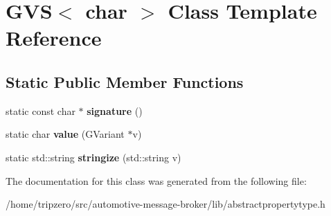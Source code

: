 \hypertarget{classGVS_3_01char_01_4}{\section{G\-V\-S$<$ char $>$ Class Template Reference}
\label{classGVS_3_01char_01_4}
}
\subsection*{Static Public Member Functions}
\begin{DoxyCompactItemize}
\item 
\hypertarget{classGVS_3_01char_01_4_a99899c615057156f961eee40c3ffa054}{static const char $\ast$ {\bfseries signature} ()}\label{classGVS_3_01char_01_4_a99899c615057156f961eee40c3ffa054}

\item 
\hypertarget{classGVS_3_01char_01_4_a1ea37cc4e2f186ed71296a856bde3ea0}{static char {\bfseries value} (G\-Variant $\ast$v)}\label{classGVS_3_01char_01_4_a1ea37cc4e2f186ed71296a856bde3ea0}

\item 
\hypertarget{classGVS_3_01char_01_4_ab3eb5abbfb3a71184aa7741a5bd25dd8}{static std\-::string {\bfseries stringize} (std\-::string v)}\label{classGVS_3_01char_01_4_ab3eb5abbfb3a71184aa7741a5bd25dd8}

\end{DoxyCompactItemize}


The documentation for this class was generated from the following file\-:\begin{DoxyCompactItemize}
\item 
/home/tripzero/src/automotive-\/message-\/broker/lib/abstractpropertytype.\-h\end{DoxyCompactItemize}
